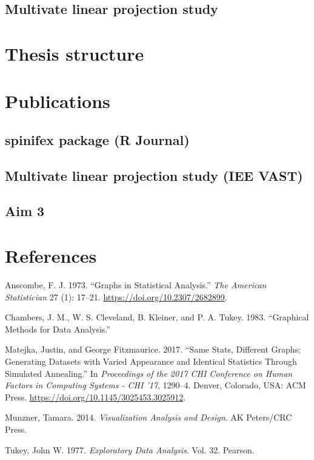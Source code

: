 \documentclass[11,]{article}
\begin{document}
\hypertarget{multivate-linear-projection-study}{%
\subsection{Multivate linear projection study}\label{multivate-linear-projection-study}}

\hypertarget{thesis-structure}{%
\section{Thesis structure}\label{thesis-structure}}

\hypertarget{publications}{%
\section{Publications}\label{publications}}

\hypertarget{spinifex-package-r-journal}{%
\subsection{spinifex package (R Journal)}\label{spinifex-package-r-journal}}

\hypertarget{multivate-linear-projection-study-iee-vast}{%
\subsection{Multivate linear projection study (IEE VAST)}\label{multivate-linear-projection-study-iee-vast}}

\hypertarget{aim-3}{%
\subsection{Aim 3}\label{aim-3}}

\hypertarget{references}{%
\section*{References}\label{references}}

\hypertarget{refs}{}
\leavevmode\hypertarget{ref-anscombe_graphs_1973}{}%
Anscombe, F. J. 1973. ``Graphs in Statistical Analysis.'' \emph{The American Statistician} 27 (1): 17--21. \url{https://doi.org/10.2307/2682899}.

\leavevmode\hypertarget{ref-chambers_graphical_1983}{}%
Chambers, J. M., W. S. Cleveland, B. Kleiner, and P. A. Tukey. 1983. ``Graphical Methods for Data Analysis.''

\leavevmode\hypertarget{ref-matejka_same_2017}{}%
Matejka, Justin, and George Fitzmaurice. 2017. ``Same Stats, Different Graphs: Generating Datasets with Varied Appearance and Identical Statistics Through Simulated Annealing.'' In \emph{Proceedings of the 2017 CHI Conference on Human Factors in Computing Systems - CHI '17}, 1290--4. Denver, Colorado, USA: ACM Press. \url{https://doi.org/10.1145/3025453.3025912}.

\leavevmode\hypertarget{ref-munzner_visualization_2014}{}%
Munzner, Tamara. 2014. \emph{Visualization Analysis and Design}. AK Peters/CRC Press.

\leavevmode\hypertarget{ref-tukey_exploratory_1977}{}%
Tukey, John W. 1977. \emph{Exploratory Data Analysis}. Vol. 32. Pearson.
\end{document}
